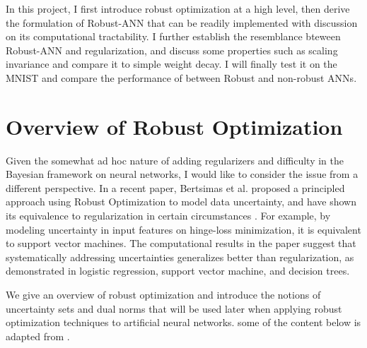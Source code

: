 \documentclass[twoside,12pt]{article}
\begin{document}
In this project, I first introduce robust optimization at a high level, then derive the formulation of Robust-ANN that can be readily implemented with discussion on its computational tractability. I further establish the resemblance bteween Robust-ANN and regularization, and discuss some properties such as scaling invariance and compare it to simple weight decay. I will finally test it on the MNIST and compare the performance of between Robust and non-robust ANNs.


\section{Overview of Robust Optimization}
Given the somewhat ad hoc nature of adding regularizers and difficulty in the Bayesian framework on neural networks, I would like to consider the issue from a different perspective. In a recent paper, Bertsimas et al. proposed a principled approach using Robust Optimization to model data uncertainty, and have shown its equivalence to regularization in certain circumstances \cite{bertsimas2015robust}. For example, by modeling uncertainty in input features  on hinge-loss minimization, it is equivalent to support vector machines. The computational results in the paper suggest that systematically addressing uncertainties generalizes better than regularization, as demonstrated in logistic regression, support vector machine, and decision trees. 



We give an overview of robust optimization and introduce the notions of uncertainty sets and dual norms that will be used later when applying robust optimization techniques to artificial neural networks. some of the content below is adapted from \cite{bertsimas2015robust}.
\end{document}
